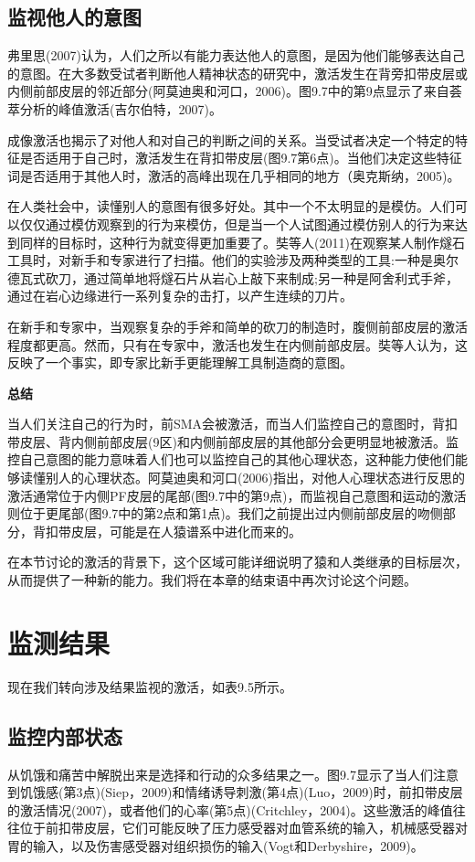 \subsection{监视他人的意图}
\par
弗里思(2007)认为，人们之所以有能力表达他人的意图，是因为他们能够表达自己的意图。在大多数受试者判断他人精神状态的研究中，激活发生在背旁扣带皮层或内侧前部皮层的邻近部分(阿莫迪奥和河口，2006)。图9.7中的第9点显示了来自荟萃分析的峰值激活(吉尔伯特，2007)。
\par
成像激活也揭示了对他人和对自己的判断之间的关系。当受试者决定一个特定的特征是否适用于自己时，激活发生在背扣带皮层(图9.7第6点)。当他们决定这些特征词是否适用于其他人时，激活的高峰出现在几乎相同的地方（奥克斯纳，2005)。
\par
在人类社会中，读懂别人的意图有很多好处。其中一个不太明显的是模仿。人们可以仅仅通过模仿观察到的行为来模仿，但是当一个人试图通过模仿别人的行为来达到同样的目标时，这种行为就变得更加重要了。奘等人(2011)在观察某人制作燧石工具时，对新手和专家进行了扫描。他们的实验涉及两种类型的工具:一种是奥尔德瓦式砍刀，通过简单地将燧石片从岩心上敲下来制成;另一种是阿舍利式手斧，通过在岩心边缘进行一系列复杂的击打，以产生连续的刀片。
\par
在新手和专家中，当观察复杂的手斧和简单的砍刀的制造时，腹侧前部皮层的激活程度都更高。然而，只有在专家中，激活也发生在内侧前部皮层。奘等人认为，这反映了一个事实，即专家比新手更能理解工具制造商的意图。
\par
\textbf{总结}
\par
当人们关注自己的行为时，前SMA会被激活，而当人们监控自己的意图时，背扣带皮层、背内侧前部皮层(9区)和内侧前部皮层的其他部分会更明显地被激活。监控自己意图的能力意味着人们也可以监控自己的其他心理状态，这种能力使他们能够读懂别人的心理状态。阿莫迪奥和河口(2006)指出，对他人心理状态进行反思的激活通常位于内侧PF皮层的尾部(图9.7中的第9点)，而监视自己意图和运动的激活则位于更尾部(图9.7中的第2点和第1点)。我们之前提出过内侧前部皮层的吻侧部分，背扣带皮层，可能是在人猿谱系中进化而来的。
\par
在本节讨论的激活的背景下，这个区域可能详细说明了猿和人类继承的目标层次，从而提供了一种新的能力。我们将在本章的结束语中再次讨论这个问题。
\section{监测结果}
\par
现在我们转向涉及结果监视的激活，如表9.5所示。
\subsection{监控内部状态}
\par
从饥饿和痛苦中解脱出来是选择和行动的众多结果之一。图9.7显示了当人们注意到饥饿感(第3点)(Siep，2009)和情绪诱导刺激(第4点)(Luo，2009)时，前扣带皮层的激活情况(2007)，或者他们的心率(第5点)(Critchley，2004)。这些激活的峰值往往位于前扣带皮层，它们可能反映了压力感受器对血管系统的输入，机械感受器对胃的输入，以及伤害感受器对组织损伤的输入(Vogt和Derbyshire，2009)。
\par

